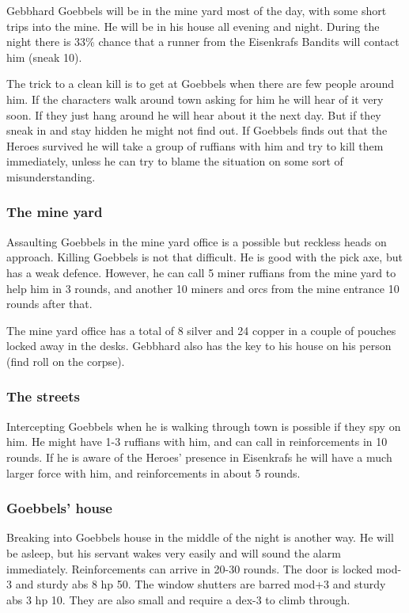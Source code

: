 Gebbhard Goebbels will be in the mine yard most of the day, with some short trips into the mine. He will be in his house all evening and night. During the night there is 33\% chance that a runner from the Eisenkrafs Bandits will contact him (sneak 10).

The trick to a clean kill is to get at Goebbels when there are few people around him. If the characters walk around town asking for him he will hear of it very soon. If they just hang around he will hear about it the next day. But if they sneak in and stay hidden he might not find out. If Goebbels finds out that the Heroes survived he will take a group of ruffians with him and try to kill them immediately, unless he can try to blame the situation on some sort of misunderstanding.


\subsubsection*{The mine yard}
Assaulting Goebbels in the mine yard office is a possible but reckless heads on approach. Killing Goebbels is not that difficult. He is good with the pick axe, but has a weak defence. However, he can call 5 miner ruffians from the mine yard to help him in 3 rounds, and another 10 miners and orcs from the mine entrance 10 rounds after that.

The mine yard office has a total of 8 silver and 24 copper in a couple of pouches locked away in the desks.
Gebbhard also has the key to his house on his person (find roll on the corpse).


\subsubsection*{The streets}
Intercepting Goebbels when he is walking through town is possible if they spy on him. He might have 1-3 ruffians with him, and can call in reinforcements in 10 rounds. If he is aware of the Heroes' presence in Eisenkrafs he will have a much larger force with him, and reinforcements in about 5 rounds.


\subsubsection*{Goebbels' house}
Breaking into Goebbels house in the middle of the night is another way. He will be asleep, but his servant wakes very easily and will sound the alarm immediately. Reinforcements can arrive in 20-30 rounds.
The door is locked mod-3 and sturdy abs 8 hp 50. The window shutters are barred mod+3 and sturdy abs 3 hp 10. They are also small and require a dex-3 to climb through.


